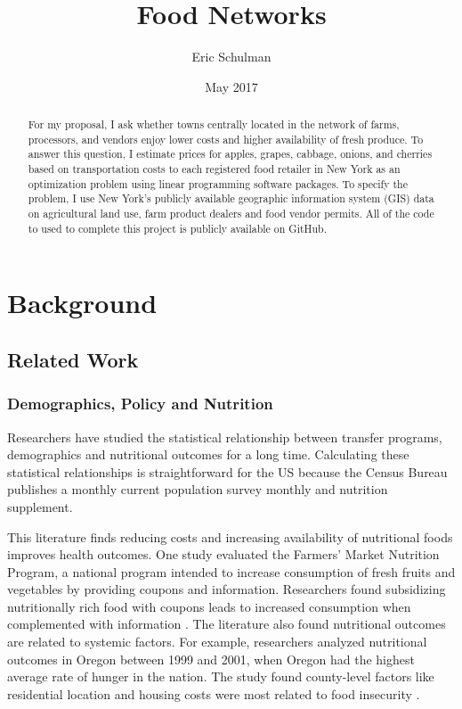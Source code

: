 \documentclass{report}
\title{Food Networks}
\author{Eric Schulman}
\date{May 2017}
\begin{document}
\maketitle

\tableofcontents

\pagebreak

\begin{abstract}
For my proposal, I ask whether towns centrally located in the network of farms, processors, and vendors enjoy lower costs and higher availability of fresh produce. To answer this question, I estimate prices for apples, grapes, cabbage, onions, and cherries based on transportation costs to each registered food retailer in New York as an optimization problem using linear programming software packages. To specify the problem, I use New York's publicly available geographic information system (GIS) data on agricultural land use, farm product dealers and food vendor permits. All of the code to used to complete this project is publicly available on GitHub.
\end{abstract}


\chapter{Background}

\section{Related Work}
\subsection{Demographics, Policy and Nutrition}
Researchers have studied the statistical relationship between transfer programs, demographics and nutritional outcomes for a long time. Calculating these statistical relationships is straightforward for the US because the Census Bureau publishes a monthly current population survey monthly and nutrition supplement. 

This literature finds reducing costs and increasing availability of nutritional foods improves health outcomes. One study evaluated the Farmers' Market Nutrition Program, a national program intended to increase consumption of fresh fruits and vegetables by providing coupons and information. Researchers found subsidizing nutritionally rich food with coupons leads to increased consumption when complemented with information \cite{Just}. The literature also found nutritional outcomes are related to systemic factors. For example, researchers analyzed nutritional outcomes in Oregon between 1999 and 2001, when Oregon had the highest average rate of hunger in the nation. The study found county-level factors like residential location and housing costs were most related to food insecurity \cite{Bernell}. 
\end{document}

